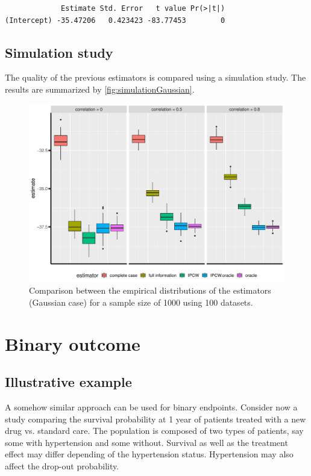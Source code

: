 \documentclass[12pt]{article}
\begin{document}
\begin{verbatim}
             Estimate Std. Error   t value Pr(>|t|)
(Intercept) -35.47206   0.423423 -83.77453        0
\end{verbatim}


\clearpage

\subsection{Simulation study}
\label{sec:org942174d}

The quality of the previous estimators is compared using a simulation
study. The results are summarized by \autoref{fig:simulationGaussian}.

\begin{figure}[!h]
\centering
\includegraphics[width=\textwidth]{./figures/simStudy-bias.pdf}
\caption{\label{fig:simulationGaussian}Comparison between the empirical distributions of the estimators (Gaussian case) for a sample size of 1000 using 100 datasets.}
\end{figure}

\bigskip

\section{Binary outcome}
\label{sec:orgda01e26}

\subsection{Illustrative example}
\label{sec:org5b6bb88}
A somehow similar approach can be used for binary endpoints. Consider
now a study comparing the survival probability at 1 year of patients
treated with a new drug vs. standard care. The population is composed
of two types of patients, say some with hypertension and some
without. Survival as well as the treatment effect may differ depending
of the hypertension status. Hypertension may also affect the drop-out
probability.
\end{document}
